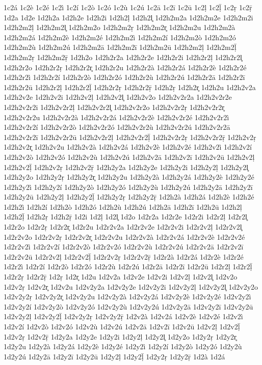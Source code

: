 {1c2á
1c2è
1c2é
1c2ì
1c2í
1c2ò
1c2ó
1c2ù
1c2ú
1c2ā
1c2ī
1c2ū
1c2ḷ
1c2ḹ
1c2ṛ
1c2ṝ
1d2a
1d2e
1d2h2a
1d2h2e
1d2h2i
1d2h2ḷ
1d2h2l̥
1d2h2m2a
1d2h2m2e
1d2h2m2i
1d2h2m2ḷ
1d2h2m2l̥
1d2h2m2o
1d2h2m2ṛ
1d2h2m2r̥
1d2h2m2u
1d2h2m2à
1d2h2m2á
1d2h2m2è
1d2h2m2é
1d2h2m2ì
1d2h2m2í
1d2h2m2ò
1d2h2m2ó
1d2h2m2ù
1d2h2m2ú
1d2h2m2ā
1d2h2m2ī
1d2h2m2ū
1d2h2m2ḷ
1d2h2m2ḹ
1d2h2m2ṛ
1d2h2m2ṝ
1d2h2o
1d2h2r2a
1d2h2r2e
1d2h2r2i
1d2h2r2ḷ
1d2h2r2l̥
1d2h2r2o
1d2h2r2ṛ
1d2h2r2r̥
1d2h2r2u
1d2h2r2à
1d2h2r2á
1d2h2r2è
1d2h2r2é
1d2h2r2ì
1d2h2r2í
1d2h2r2ò
1d2h2r2ó
1d2h2r2ù
1d2h2r2ú
1d2h2r2ā
1d2h2r2ī
1d2h2r2ū
1d2h2r2ḷ
1d2h2r2ḹ
1d2h2r2ṛ
1d2h2r2ṝ
1d2h2ṛ
1d2h2r̥
1d2h2u
1d2h2v2a
1d2h2v2e
1d2h2v2i
1d2h2v2ḷ
1d2h2v2l̥
1d2h2v2o
1d2h2v2r2a
1d2h2v2r2e
1d2h2v2r2i
1d2h2v2r2ḷ
1d2h2v2r2l̥
1d2h2v2r2o
1d2h2v2r2ṛ
1d2h2v2r2r̥
1d2h2v2r2u
1d2h2v2r2à
1d2h2v2r2á
1d2h2v2r2è
1d2h2v2r2é
1d2h2v2r2ì
1d2h2v2r2í
1d2h2v2r2ò
1d2h2v2r2ó
1d2h2v2r2ù
1d2h2v2r2ú
1d2h2v2r2ā
1d2h2v2r2ī
1d2h2v2r2ū
1d2h2v2r2ḷ
1d2h2v2r2ḹ
1d2h2v2r2ṛ
1d2h2v2r2ṝ
1d2h2v2ṛ
1d2h2v2r̥
1d2h2v2u
1d2h2v2à
1d2h2v2á
1d2h2v2è
1d2h2v2é
1d2h2v2ì
1d2h2v2í
1d2h2v2ò
1d2h2v2ó
1d2h2v2ù
1d2h2v2ú
1d2h2v2ā
1d2h2v2ī
1d2h2v2ū
1d2h2v2ḷ
1d2h2v2ḹ
1d2h2v2ṛ
1d2h2v2ṝ
1d2h2y2a
1d2h2y2e
1d2h2y2i
1d2h2y2ḷ
1d2h2y2l̥
1d2h2y2o
1d2h2y2ṛ
1d2h2y2r̥
1d2h2y2u
1d2h2y2à
1d2h2y2á
1d2h2y2è
1d2h2y2é
1d2h2y2ì
1d2h2y2í
1d2h2y2ò
1d2h2y2ó
1d2h2y2ù
1d2h2y2ú
1d2h2y2ā
1d2h2y2ī
1d2h2y2ū
1d2h2y2ḷ
1d2h2y2ḹ
1d2h2y2ṛ
1d2h2y2ṝ
1d2h2à
1d2h2á
1d2h2è
1d2h2é
1d2h2ì
1d2h2í
1d2h2ò
1d2h2ó
1d2h2ù
1d2h2ú
1d2h2ā
1d2h2ī
1d2h2ū
1d2h2ḷ
1d2h2ḹ
1d2h2ṛ
1d2h2ṝ
1d2i
1d2ḷ
1d2l̥
1d2o
1d2r2a
1d2r2e
1d2r2i
1d2r2ḷ
1d2r2l̥
1d2r2o
1d2r2ṛ
1d2r2r̥
1d2r2u
1d2r2v2a
1d2r2v2e
1d2r2v2i
1d2r2v2ḷ
1d2r2v2l̥
1d2r2v2o
1d2r2v2ṛ
1d2r2v2r̥
1d2r2v2u
1d2r2v2à
1d2r2v2á
1d2r2v2è
1d2r2v2é
1d2r2v2ì
1d2r2v2í
1d2r2v2ò
1d2r2v2ó
1d2r2v2ù
1d2r2v2ú
1d2r2v2ā
1d2r2v2ī
1d2r2v2ū
1d2r2v2ḷ
1d2r2v2ḹ
1d2r2v2ṛ
1d2r2v2ṝ
1d2r2à
1d2r2á
1d2r2è
1d2r2é
1d2r2ì
1d2r2í
1d2r2ò
1d2r2ó
1d2r2ù
1d2r2ú
1d2r2ā
1d2r2ī
1d2r2ū
1d2r2ḷ
1d2r2ḹ
1d2r2ṛ
1d2r2ṝ
1d2ṛ
1d2r̥
1d2u
1d2v2a
1d2v2e
1d2v2i
1d2v2ḷ
1d2v2l̥
1d2v2o
1d2v2ṛ
1d2v2r̥
1d2v2u
1d2v2y2a
1d2v2y2e
1d2v2y2i
1d2v2y2ḷ
1d2v2y2l̥
1d2v2y2o
1d2v2y2ṛ
1d2v2y2r̥
1d2v2y2u
1d2v2y2à
1d2v2y2á
1d2v2y2è
1d2v2y2é
1d2v2y2ì
1d2v2y2í
1d2v2y2ò
1d2v2y2ó
1d2v2y2ù
1d2v2y2ú
1d2v2y2ā
1d2v2y2ī
1d2v2y2ū
1d2v2y2ḷ
1d2v2y2ḹ
1d2v2y2ṛ
1d2v2y2ṝ
1d2v2à
1d2v2á
1d2v2è
1d2v2é
1d2v2ì
1d2v2í
1d2v2ò
1d2v2ó
1d2v2ù
1d2v2ú
1d2v2ā
1d2v2ī
1d2v2ū
1d2v2ḷ
1d2v2ḹ
1d2v2ṛ
1d2v2ṝ
1d2y2a
1d2y2e
1d2y2i
1d2y2ḷ
1d2y2l̥
1d2y2o
1d2y2ṛ
1d2y2r̥
1d2y2u
1d2y2à
1d2y2á
1d2y2è
1d2y2é
1d2y2ì
1d2y2í
1d2y2ò
1d2y2ó
1d2y2ù
1d2y2ú
1d2y2ā
1d2y2ī
1d2y2ū
1d2y2ḷ
1d2y2ḹ
1d2y2ṛ
1d2y2ṝ
1d2à
1d2á
}
